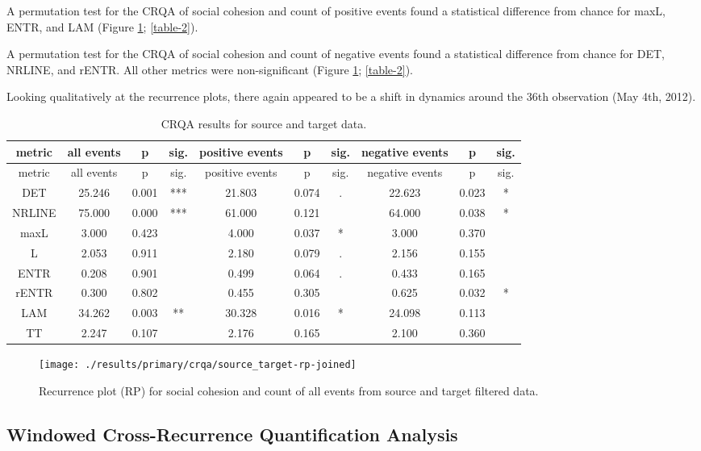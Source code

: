 \documentclass[
  english,
  man]{apa6}
\begin{document}
A permutation test for the CRQA of social cohesion and count of positive events
found a statistical difference from chance for maxL, ENTR, and LAM (Figure
\ref{fig:plot-rp-source-targ}; \autoref{table-2}).

A permutation test for the CRQA of social cohesion and count of negative events
found a statistical difference from chance for DET, NRLINE, and rENTR. All other
metrics were non-significant (Figure \ref{fig:plot-rp-source-targ};
\autoref{table-2}).

Looking qualitatively at the recurrence plots, there again appeared to be a
shift in dynamics around the 36th observation (May 4th, 2012).

\begin{longtable}[]{@{}cccccccccc@{}}
\caption{\label{table-2}CRQA results for source and target data.}\tabularnewline
\toprule
metric & all events & p & sig. & positive events & p & sig. & negative events & p & sig.\tabularnewline
\midrule
\endfirsthead
\toprule
metric & all events & p & sig. & positive events & p & sig. & negative events & p & sig.\tabularnewline
\midrule
\endhead
DET & 25.246 & 0.001 & *** & 21.803 & 0.074 & . & 22.623 & 0.023 & *\tabularnewline
NRLINE & 75.000 & 0.000 & *** & 61.000 & 0.121 & & 64.000 & 0.038 & *\tabularnewline
maxL & 3.000 & 0.423 & & 4.000 & 0.037 & * & 3.000 & 0.370 &\tabularnewline
L & 2.053 & 0.911 & & 2.180 & 0.079 & . & 2.156 & 0.155 &\tabularnewline
ENTR & 0.208 & 0.901 & & 0.499 & 0.064 & . & 0.433 & 0.165 &\tabularnewline
rENTR & 0.300 & 0.802 & & 0.455 & 0.305 & & 0.625 & 0.032 & *\tabularnewline
LAM & 34.262 & 0.003 & ** & 30.328 & 0.016 & * & 24.098 & 0.113 &\tabularnewline
TT & 2.247 & 0.107 & & 2.176 & 0.165 & & 2.100 & 0.360 &\tabularnewline
\bottomrule
\end{longtable}

\begin{figure}
\texttt{[image: ./results/primary/crqa/source\_target-rp-joined]} \caption{Recurrence plot (RP) for social cohesion and count of all events from source and target filtered data.}\label{fig:plot-rp-source-targ}
\end{figure}

\hypertarget{windowed-cross-recurrence-quantification-analysis-1}{%
\subsection{Windowed Cross-Recurrence Quantification Analysis}\label{windowed-cross-recurrence-quantification-analysis-1}}
\end{document}
